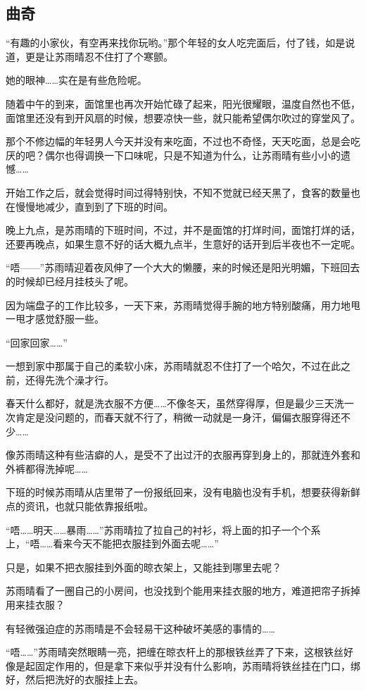 \subsection{曲奇}

“有趣的小家伙，有空再来找你玩哟。”那个年轻的女人吃完面后，付了钱，如是说道，更是让苏雨晴忍不住打了个寒颤。

她的眼神……实在是有些危险呢。

随着中午的到来，面馆里也再次开始忙碌了起来，阳光很耀眼，温度自然也不低，面馆里还没有到开风扇的时候，想要凉快一些，就只能希望偶尔吹过的穿堂风了。

那个不修边幅的年轻男人今天并没有来吃面，不过也不奇怪，天天吃面，总是会吃厌的吧？偶尔也得调换一下口味呢，只是不知道为什么，让苏雨晴有些小小的遗憾……

开始工作之后，就会觉得时间过得特别快，不知不觉就已经天黑了，食客的数量也在慢慢地减少，直到到了下班的时间。

晚上九点，是苏雨晴的下班时间，不过，并不是面馆的打烊时间，面馆打烊的话，还要再晚点，如果生意不好的话大概九点半，生意好的话开到后半夜也不一定呢。

“唔——”苏雨晴迎着夜风伸了一个大大的懒腰，来的时候还是阳光明媚，下班回去的时候却已经月挂枝头了呢。

因为端盘子的工作比较多，一天下来，苏雨晴觉得手腕的地方特别酸痛，用力地甩一甩才感觉舒服一些。

“回家回家……”

一想到家中那属于自己的柔软小床，苏雨晴就忍不住打了一个哈欠，不过在此之前，还得先洗个澡才行。

春天什么都好，就是洗衣服不方便……不像冬天，虽然穿得厚，但是最少三天洗一次肯定是没问题的，而春天就不行了，稍微一动就是一身汗，偏偏衣服穿得还不少……

像苏雨晴这种有些洁癖的人，是受不了出过汗的衣服再穿到身上的，那就连外套和外裤都得洗掉呢……

下班的时候苏雨晴从店里带了一份报纸回来，没有电脑也没有手机，想要获得新鲜点的资讯，也就只能依靠报纸啦。

“唔……明天……暴雨……”苏雨晴拉了拉自己的衬衫，将上面的扣子一个个系上，“唔……看来今天不能把衣服挂到外面去呢……”

只是，如果不把衣服挂到外面的晾衣架上，又能挂到哪里去呢？

苏雨晴看了一圈自己的小房间，也没找到个能用来挂衣服的地方，难道把帘子拆掉用来挂衣服？

有轻微强迫症的苏雨晴是不会轻易干这种破坏美感的事情的……

“唔……”苏雨晴突然眼睛一亮，把缠在晾衣杆上的那根铁丝弄了下来，这根铁丝好像是起固定作用的，但是拿下来似乎并没有什么影响，苏雨晴将铁丝挂在门口，绑好，然后把洗好的衣服挂上去。

